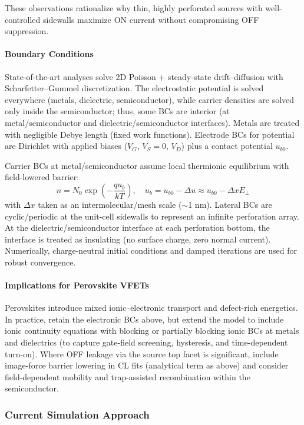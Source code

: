 \documentclass{article}
\begin{document}
These observations rationalize why thin, highly perforated sources with well-controlled sidewalls maximize ON current without compromising OFF suppression.

\paragraph{Boundary Conditions}
State-of-the-art analyses solve 2D Poisson + steady-state drift–diffusion with Scharfetter–Gummel discretization. The electrostatic potential is solved everywhere (metals, dielectric, semiconductor), while carrier densities are solved only inside the semiconductor; thus, some BCs are interior (at metal/semiconductor and dielectric/semiconductor interfaces). Metals are treated with negligible Debye length (fixed work functions). Electrode BCs for potential are Dirichlet with applied biases ($V_G$, $V_S = 0$, $V_D$) plus a contact potential $u_{b0}$. 

Carrier BCs at metal/semiconductor assume local thermionic equilibrium with field-lowered barrier:
\begin{equation}
n = N_0 \exp\left(-\frac{q u_b}{kT}\right), \quad u_b = u_{b0}-\Delta u \approx u_{b0}-\Delta x E_\perp
\end{equation}
with $\Delta x$ taken as an intermolecular/mesh scale ($\sim$1 nm). Lateral BCs are cyclic/periodic at the unit-cell sidewalls to represent an infinite perforation array. At the dielectric/semiconductor interface at each perforation bottom, the interface is treated as insulating (no surface charge, zero normal current). Numerically, charge-neutral initial conditions and damped iterations are used for robust convergence.

\paragraph{Implications for Perovskite VFETs}
Perovskites introduce mixed ionic–electronic transport and defect-rich energetics. In practice, retain the electronic BCs above, but extend the model to include ionic continuity equations with blocking or partially blocking ionic BCs at metals and dielectrics (to capture gate-field screening, hysteresis, and time-dependent turn-on). Where OFF leakage via the source top facet is significant, include image-force barrier lowering in CL fits (analytical term as above) and consider field-dependent mobility and trap-assisted recombination within the semiconductor.

\subsubsection{Current Simulation Approach}
\end{document}
